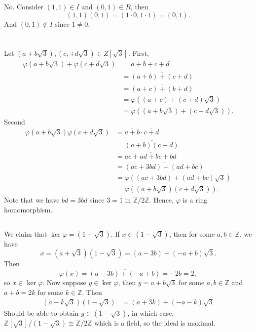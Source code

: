 \documentclass[12pt]{article}
\theoremstyle{definition}
\newcommand{\Z}{\mathbb{Z}}
\renewcommand{\phi}{\varphi}
\newcommand{\isom}{\cong}
\newcommand{\eqc}{\overline}
\begin{document}
\subsection{}

No. Consider $(1, 1) \in I$ and $(0, 1) \in R$, then
\[
    (1, 1)(0, 1) = (1\cdot 0 , 1 \cdot 1) = (0, 1).
\]
And $(0, 1) \notin I$ since $1 \ne 0$.



\newpage
\section{}

\subsection{}

Let $(a + b\sqrt{3}), (c, +d\sqrt{3}) \in Z[\sqrt{3}]$. First,
\begin{align*}
    \phi(a + b\sqrt{3}) + \phi(c + d\sqrt{3})
        &= \eqc{a + b} + \eqc{c + d} \\
        &= \eqc{(a + b) + (c + d)} \\
        &= \eqc{(a + c) + (b + d)} \\
        &= \phi((a+c) + (c+d)\sqrt{3}) \\
        &= \phi((a+b\sqrt{3}) + (c+d\sqrt{3})).
\end{align*}
Second
\begin{align*}
    \phi(a + b\sqrt{3})\phi(c + d\sqrt{3})
        &= \eqc{a + b} \cdot \eqc{c + d} \\
        &= \eqc{(a + b)(c + d)} \\
        &= \eqc{ac + ad + bc + bd}\\
        &= \eqc{(ac + 3bd) + (ad + bc)}\\
        &= \phi((ac + 3bd) + (ad + bc)\sqrt{3}) \\
        &= \phi((a + b\sqrt{3})(c + d\sqrt{3})).
\end{align*}
Note that we have $\eqc{bd} = \eqc{3bd}$ since $\eqc{3} = \eqc{1}$ in $\Z/2\Z$. Hence, $\phi$ is a ring homomorphism.

\subsection{}

We claim that $\ker \phi = (1 - \sqrt{3})$. If $x \in (1 - \sqrt{3})$, then for some $a, b \in \Z$, we have
\[
    x = (a + \sqrt{3})(1 - \sqrt{3}) = (a - 3b) + (-a + b)\sqrt{3}.
\]
Then
\[
    \phi(x) = \eqc{(a - 3b) + (-a + b)} = \eqc{-2b} = 2,
\]
so $x \in \ker \phi$. Now suppose $y \in \ker \phi$, then $y = a + b\sqrt{3}$ for some $a, b \in \Z$ and $a + b = 2k$ for some $k \in \Z$. Then
\begin{align*}
    (a - k\sqrt{3})(1 - \sqrt{3})
        &= (a + 3k) + (-a - k)\sqrt{3}
\end{align*}
Should be able to obtain $y \in (1 - \sqrt{3})$, in which case, $\Z[\sqrt{3}]/(1- \sqrt{3}) \isom \Z/2\Z$ which is a field, so the ideal is maximal.
\end{document}
